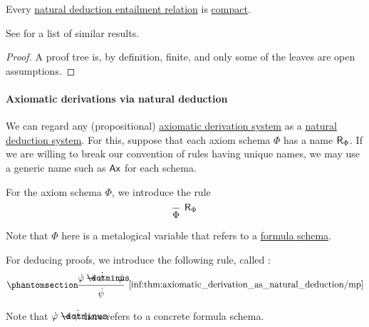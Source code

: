 \begin{proposition}\label{thm:propositional_natural_deduction_entailment_compact}
  Every \hyperref[def:natural_deduction_entailment]{natural deduction entailment relation} is \hyperref[def:consequence_relation/compactness]{compact}.
\end{proposition}
\begin{comments}
  \item See  for a list of similar results.
\end{comments}
\begin{proof}
  A proof tree is, by definition, finite, and only some of the leaves are open assumptions.
\end{proof}

\paragraph{Axiomatic derivations via natural deduction}

\begin{remark}\label{rem:axiomatic_derivation_system_as_natural_deduction_system}
  We can regard any (propositional) \hyperref[def:axiomatic_derivation_system]{axiomatic derivation system} as a \hyperref[def:abstract_natural_deduction_system]{natural deduction system}. For this, suppose that each axiom schema \( \Phi \) has a name \( \textsf{R}_\Phi \). If we are willing to break our convention of rules having unique names, we may use a generic name such as \( \textsf{Ax} \) for each schema.

  \begin{thmenum}
     For the axiom schema \( \Phi \), we introduce the rule
    \begin{equation*}
      \begin{prooftree}
        \infer0[\ensuremath{ \logic{R}_\Phi }]{ \Phi }
      \end{prooftree}
    \end{equation*}

    Note that \( \Phi \) here is a metalogical variable that refers to a \hyperref[def:propositional_formula_schema]{formula schema}.

     For deducing proofs, we introduce the following rule, called :
    \begin{equation*}\taglabel[\ensuremath{ \logic{MP} }]{inf:thm:axiomatic_derivation_as_natural_deduction/mp}
      \begin{prooftree}
        \hypo{ \syn\varphi \synimplies \syn\psi }
        \hypo{ \syn\varphi }
        \infer2[\ref{inf:thm:axiomatic_derivation_as_natural_deduction/mp}]{ \syn\psi }
      \end{prooftree}
    \end{equation*}

    Note that \( \syn\varphi \synimplies \syn\psi \) here refers to a concrete formula schema.
  \end{thmenum}
\end{remark}

